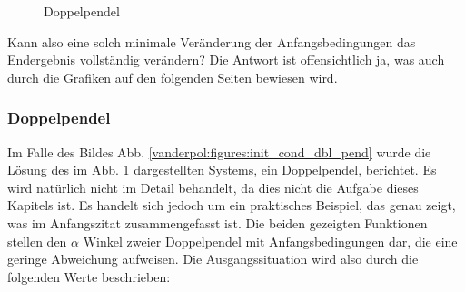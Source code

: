 \begin{figure}
\centering
{}
\caption{Doppelpendel\label{vanderpol:figures:doublependulum}}
\end{figure}
Kann also eine solch minimale Veränderung der Anfangsbedingungen das Endergebnis vollständig verändern? Die Antwort ist offensichtlich ja, was auch durch die Grafiken auf den folgenden Seiten bewiesen wird.
\subsubsection{Doppelpendel}
\label{vanderpol:subsubsection:doppelpendel}
Im Falle des Bildes Abb. \ref{vanderpol:figures:init_cond_dbl_pend} wurde die Lösung des im Abb. \ref{vanderpol:figures:doublependulum} dargestellten Systems, ein Doppelpendel, berichtet. Es wird natürlich nicht im Detail behandelt, da dies nicht die Aufgabe dieses Kapitels ist. Es handelt sich jedoch um ein praktisches Beispiel, das genau zeigt, was im Anfangszitat zusammengefasst ist. Die beiden gezeigten Funktionen stellen den $\alpha$ Winkel zweier Doppelpendel mit Anfangsbedingungen dar, die eine geringe Abweichung aufweisen. Die Ausgangssituation wird also durch die folgenden Werte beschrieben:


